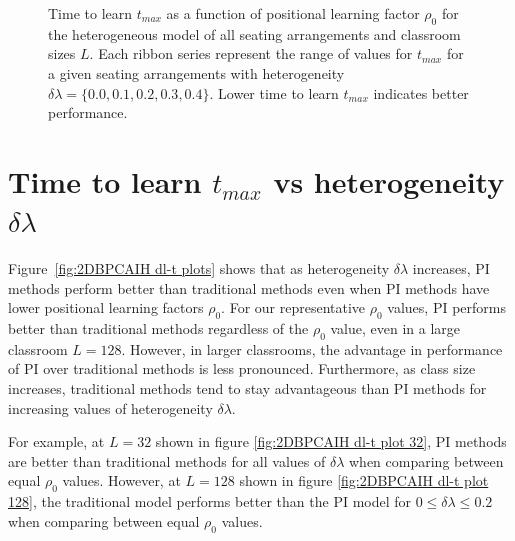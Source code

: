 \begin{figure}[htbp!]
   \caption[Positional learning factor $\rho_0$ dependence of time to learn $t_{max}$ for the heterogeneous classroom model for all SAs and classroom lengths $L$]{Time to learn $t_{max}$ as a function of positional learning factor $\rho_0$ for the heterogeneous model of all seating arrangements and classroom sizes $L$. 
   Each ribbon series represent the range of values for $t_{max}$ for a given seating arrangements with heterogeneity $\delta\lambda = \lbrace 0.0, 0.1, 0.2, 0.3, 0.4 \rbrace$.
   Lower time to learn $t_{max}$ indicates better performance.
   }
   \label{fig:2DBPCAIH t-rho ribbon plot}
\end{figure}

\newpage %

\section{Time to learn $t_{max}$ vs heterogeneity $\delta\lambda$}\label{sec:BPCAIH t vs dl}

Figure~\ref{fig:2DBPCAIH dl-t plots} shows that as heterogeneity $\delta\lambda$ increases, PI methods perform better than traditional methods even when PI methods have lower positional learning factors $\rho_0$. For our representative $\rho_0$ values, PI performs better than traditional methods regardless of the $\rho_0$ value, even in a large classroom $L=128$. 
However, in larger classrooms, the advantage in performance of PI over traditional methods is less pronounced. 
Furthermore, as class size increases, traditional methods tend to stay advantageous than PI methods for increasing values of heterogeneity $\delta\lambda$.

For example, at $L=32$ shown in figure \ref{fig:2DBPCAIH dl-t plot 32}, PI methods are better than traditional methods for all values of $\delta\lambda$ when comparing between equal $\rho_0$ values. 
However, at $L=128$ shown in figure \ref{fig:2DBPCAIH dl-t plot 128}, the traditional model performs better than the PI model for $0 \leq \delta\lambda \leq 0.2$ when comparing between equal $\rho_0$ values.

